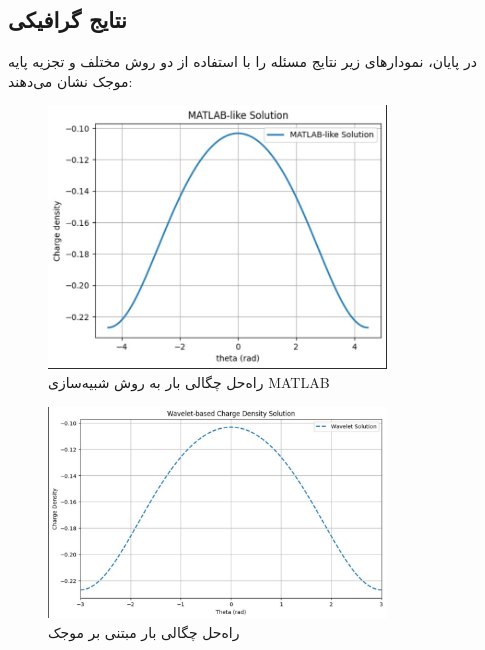 \documentclass[12pt,a4paper]{article}
\begin{document}
\subsection{نتایج گرافیکی}
در پایان، نمودارهای زیر نتایج مسئله را با استفاده از دو روش مختلف و تجزیه پایه موجک نشان می‌دهند:

\begin{figure}[h!]
    \centering
    \includegraphics[width=0.8\textwidth]{1.jpg}
    \caption{راه‌حل چگالی بار به روش شبیه‌سازی MATLAB}
\end{figure}

\begin{figure}[h!]
    \centering
    \includegraphics[width=0.8\textwidth]{2.jpg}
    \caption{راه‌حل چگالی بار مبتنی بر موجک}
\end{figure}
\end{document}
